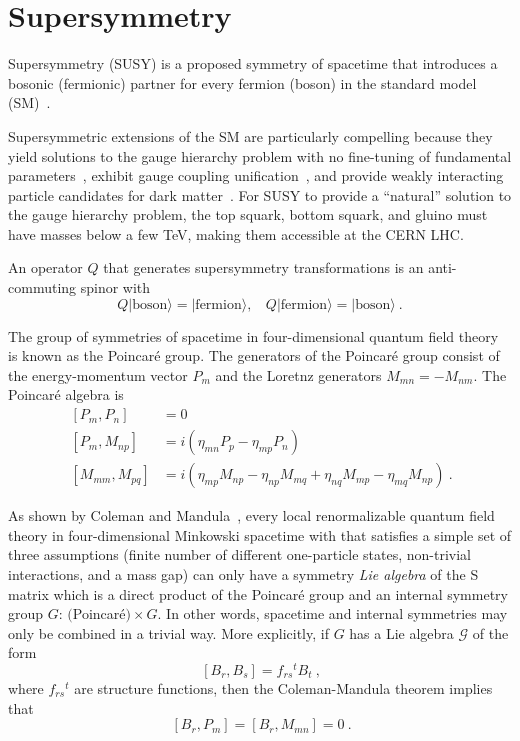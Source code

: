 \section{Supersymmetry}
Supersymmetry (SUSY) is a proposed symmetry of spacetime that 
introduces a bosonic (fermionic) partner for every fermion (boson) in the 
standard model
(SM)~\cite{Wess,Golfand,Volkov,Chamseddine,Kane,Fayet,Barbieri,Hall,Ramond}.

Supersymmetric extensions of the SM are particularly compelling 
because they yield solutions to the gauge hierarchy problem with no
fine-tuning of fundamental parameters~\cite{Witten:1981nf,Dimopoulos:1981zb,Dine:1981za,Dimopoulos:1981au,Sakai:1981gr,Kaul:1981hi}, 
exhibit gauge coupling unification~\cite{Dimopoulos:1981yj,Marciano:1981un,Einhorn:1981sx,Ibanez:1981yh,Amaldi:1991cn,Langacker:1995fk},
and provide weakly interacting particle candidates for dark matter~\cite{Ellis:1983ew,Jungman:1995df}.
For SUSY to provide a ``natural'' solution to the gauge hierarchy problem,
the top squark, bottom squark, and gluino must have masses below a few
TeV, making them accessible at the CERN LHC. 

An operator $Q$ that generates supersymmetry transformations is an
anti-commuting spinor with
\begin{equation}
Q|\mathrm{boson}\rangle = |\mathrm{fermion}\rangle, ~~~~
Q|\mathrm{fermion}\rangle = |\mathrm{boson}\rangle~.
\end{equation}

The group of symmetries of spacetime in four-dimensional quantum field
theory is known as the Poincar\'{e} group. The generators of the
Poincar\'{e} group consist of the energy-momentum vector $P_m$ and the
Loretnz generators $M_{mn} = -M_{nm}$. The Poincar\'{e} algebra is
\begin{align}
~[P_m,P_n] &= 0 \nonumber\\
~[P_m,M_{np}] &= i(\eta_{mn}P_p-\eta_{mp}P_n) \nonumber\\
~[M_{mm},M_{pq}] &= i(\eta_{mp}M_{np} - \eta_{np}M_{mq} +
                   \eta_{nq}M_{mp} - \eta_{mq}M_{np} )~.
\label{eqn:poincare}
\end{align}

As shown by Coleman and Mandula~\cite{PhysRev.159.1251}, every local renormalizable quantum
field theory in four-dimensional Minkowski spacetime with that
satisfies a simple set of three assumptions (finite number of different
one-particle states, non-trivial interactions, and a mass gap) can only have a symmetry \emph{Lie algebra} of the S matrix which is a
direct product of the Poincar\'{e} group and an internal symmetry group $G$:
$($Poincar\'{e}$)\times G$. In other words, spacetime and
internal symmetries may only be combined in a trivial way. More explicitly, if $G$ has a Lie algebra $\mathcal
G$ of the form
\begin{equation}
~[B_r,B_s] = f_{rs}{}^tB_t~,
\end{equation}
where $f_{rs}{}^t$ are structure functions, then the Coleman-Mandula theorem implies that
\begin{equation}
~[B_r,P_m] = [B_r,M_{mn}] = 0~.
\end{equation}

